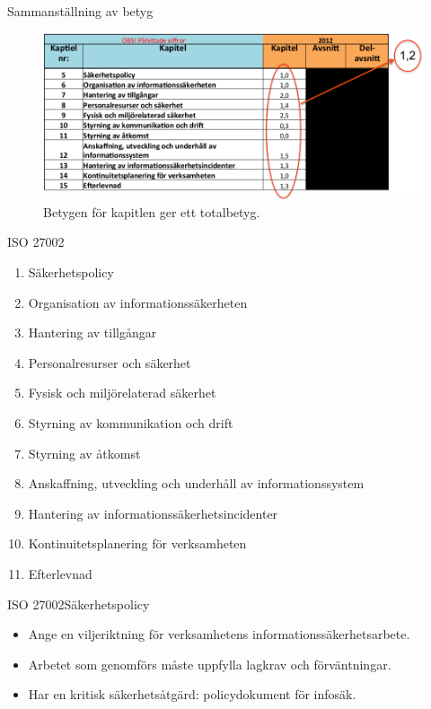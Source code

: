 \documentclass{beamer}
\begin{document}
\begin{frame}{Sammanställning av betyg}
  \begin{figure}
    \includegraphics[width=\textwidth]{gap-betyg.png}
    \caption{Betygen för kapitlen ger ett totalbetyg.}
  \end{figure}
\end{frame}
\begin{frame}{ISO 27002}
  \begin{enumerate}
    \item Säkerhetspolicy
    \item Organisation av informationssäkerheten
    \item Hantering av tillgångar
    \item Personalresurser och säkerhet
    \item Fysisk och miljörelaterad säkerhet
    \item Styrning av kommunikation och drift
    \item Styrning av åtkomst
    \item Anskaffning, utveckling och underhåll av informationssystem
    \item Hantering av informationssäkerhetsincidenter
    \item Kontinuitetsplanering för verksamheten
    \item Efterlevnad
  \end{enumerate}
\end{frame}
\begin{frame}{ISO 27002}{Säkerhetspolicy}
  \begin{itemize}
    \item Ange en viljeriktning för verksamhetens informationssäkerhetsarbete.
    \item Arbetet som genomförs måste uppfylla lagkrav och förväntningar.
    \item Har en kritisk säkerhetsåtgärd: policydokument för infosäk.
  \end{itemize}
\end{frame}
\end{document}

